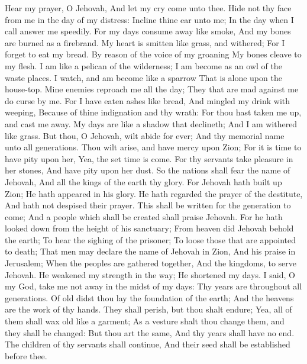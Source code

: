 Hear my prayer, O Jehovah, And let my cry come unto thee.  Hide not thy face from me in the day of my distress: Incline thine ear unto me; In the day when I call answer me speedily.  For my days consume away like smoke, And my bones are burned as a firebrand.  My heart is smitten like grass, and withered; For I forget to eat my bread.  By reason of the voice of my groaning My bones cleave to my flesh.  I am like a pelican of the wilderness; I am become as an owl of the waste places.  I watch, and am become like a sparrow That is alone upon the house-top.  Mine enemies reproach me all the day; They that are mad against me do curse by me.  For I have eaten ashes like bread, And mingled my drink with weeping,  Because of thine indignation and thy wrath: For thou hast taken me up, and cast me away.  My days are like a shadow that declineth; And I am withered like grass.  But thou, O Jehovah, wilt abide for ever; And thy memorial name unto all generations.  Thou wilt arise, and have mercy upon Zion; For it is time to have pity upon her, Yea, the set time is come.  For thy servants take pleasure in her stones, And have pity upon her dust.  So the nations shall fear the name of Jehovah, And all the kings of the earth thy glory.  For Jehovah hath built up Zion; He hath appeared in his glory.  He hath regarded the prayer of the destitute, And hath not despised their prayer.  This shall be written for the generation to come; And a people which shall be created shall praise Jehovah.  For he hath looked down from the height of his sanctuary; From heaven did Jehovah behold the earth;  To hear the sighing of the prisoner; To loose those that are appointed to death;  That men may declare the name of Jehovah in Zion, And his praise in Jerusalem;  When the peoples are gathered together, And the kingdoms, to serve Jehovah.  He weakened my strength in the way; He shortened my days.  I said, O my God, take me not away in the midst of my days: Thy years are throughout all generations.  Of old didst thou lay the foundation of the earth; And the heavens are the work of thy hands.  They shall perish, but thou shalt endure; Yea, all of them shall wax old like a garment; As a vesture shalt thou change them, and they shall be changed:  But thou art the same, And thy years shall have no end.  The children of thy servants shall continue, And their seed shall be established before thee. 

